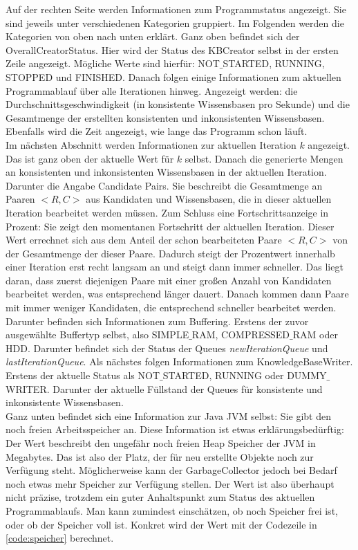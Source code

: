 \documentclass[12pt,a4paper]{article}
\begin{document}
Auf der rechten Seite werden Informationen zum Programmstatus angezeigt. Sie sind jeweils unter verschiedenen Kategorien gruppiert. Im Folgenden werden die Kategorien von oben nach unten erklärt. Ganz oben befindet sich der OverallCreatorStatus. Hier wird der Status des KBCreator selbst in der ersten Zeile angezeigt. Mögliche Werte sind hierfür: NOT$\_$STARTED, RUNNING, STOPPED und FINISHED. Danach folgen einige Informationen zum aktuellen Programmablauf über alle Iterationen hinweg. Angezeigt werden: die Durchschnittsgeschwindigkeit (in konsistente Wissensbasen pro Sekunde) und die Gesamtmenge der erstellten konsistenten und inkonsistenten Wissensbasen. Ebenfalls wird die Zeit angezeigt, wie lange das Programm schon läuft. \\
Im nächsten Abschnitt werden Informationen zur aktuellen Iteration $k$ angezeigt. Das ist ganz oben der aktuelle Wert für $k$ selbst. Danach die generierte Mengen an konsistenten und inkonsistenten Wissensbasen in der aktuellen Iteration. Darunter die Angabe \glqq Candidate Pairs\grqq . Sie beschreibt die Gesamtmenge an Paaren $<R, C>$ aus Kandidaten und Wissensbasen, die in dieser aktuellen Iteration bearbeitet werden müssen. Zum Schluss eine Fortschrittsanzeige in Prozent: Sie zeigt den momentanen Fortschritt der aktuellen Iteration. Dieser Wert errechnet sich aus dem Anteil der schon bearbeiteten Paare $<R,C>$ von der Gesamtmenge der dieser Paare. Dadurch steigt der Prozentwert innerhalb einer Iteration erst recht langsam an und steigt dann immer schneller. Das liegt daran, dass zuerst diejenigen Paare mit einer großen Anzahl von Kandidaten bearbeitet werden, was entsprechend länger dauert. Danach kommen dann Paare mit immer weniger Kandidaten, die entsprechend schneller bearbeitet werden.\\
Darunter befinden sich Informationen zum Buffering. Erstens der zuvor ausgewählte Buffertyp selbst, also SIMPLE$\_$RAM, COMPRESSED$\_$RAM oder HDD. Darunter befindet sich der Status der Queues \textit{newIterationQueue} und \textit{lastIterationQueue}. Als nächstes folgen Informationen zum KnowledgeBaseWriter. Erstens der aktuelle Status als NOT$\_$STARTED, RUNNING oder DUMMY$\_$WRITER. Darunter der aktuelle Füllstand der Queues für konsistente und inkonsistente Wissensbasen. \\
Ganz unten befindet sich eine Information zur Java JVM selbst: Sie gibt den noch freien Arbeitsspeicher an. Diese Information ist etwas erklärungsbedürftig: Der Wert beschreibt den ungefähr noch freien Heap Speicher der JVM in Megabytes. Das ist also der Platz, der für neu erstellte Objekte noch zur Verfügung steht. Möglicherweise kann der GarbageCollector jedoch bei Bedarf noch etwas mehr Speicher zur Verfügung stellen. Der Wert ist also überhaupt nicht präzise, trotzdem ein guter Anhaltspunkt zum Status des aktuellen Programmablaufs. Man kann zumindest einschätzen, ob noch Speicher frei ist, oder ob der Speicher voll ist. Konkret wird der Wert mit der Codezeile in \autoref{code:speicher} berechnet.
\end{document}
